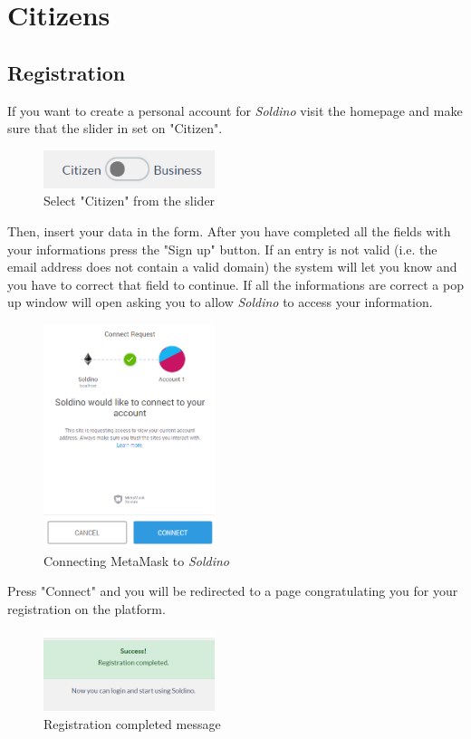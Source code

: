 \section{Citizens}
	\subsection{Registration}
	If you want to create a personal account for \textit{Soldino} visit the
	homepage and make sure that the slider in set on "Citizen".\\
	\begin{figure}[H]
		\includegraphics[width=5cm]{res/images/user_citizen.png}
		\centering
		\caption{Select "Citizen" from the slider}
	\end{figure}	
	\noindent Then, insert your data in the form. After you have completed all the
	fields with your informations press the "Sign up" button. If an entry 
	is not valid (i.e. the email address does not contain a valid domain) 
	the system will let you know and you have to correct that field to continue.
	If all the informations are correct a pop up window will open asking you 
	to allow \textit{Soldino} to access your information.\\
	\begin{figure}[H]
		\includegraphics[width=5cm]{res/images/metamask_connect.png}
		\centering
		\caption{Connecting MetaMask to \textit{Soldino}}
	\end{figure}
	\noindent Press "Connect" and you will be redirected to a page 
	congratulating you for your registration on the platform.
	\begin{figure}[H]
		\includegraphics[width=5cm]{res/images/registration_complete.png}
		\centering
		\caption{Registration completed message}
	\end{figure}
